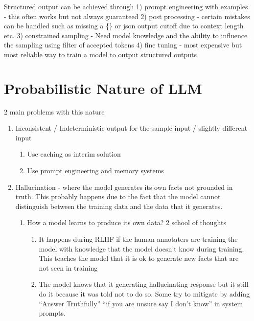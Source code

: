 \documentclass[
  letterpaper,
  DIV=11,
  numbers=noendperiod]{scrreprt}
\providecommand{\tightlist}{%
  \setlength{\itemsep}{0pt}\setlength{\parskip}{0pt}}\usepackage{longtable,booktabs,array}
\begin{document}
Structured output can be achieved through 1) prompt engineering with
examples - this often works but not always guaranteed 2) post processing
- certain mistakes can be handled such as missing a \{\} or json output
cutoff due to context length etc. 3) constrained sampling - Need model
knowledge and the ability to influence the sampling using filter of
accepted tokens 4) fine tuning - most expensive but most reliable way to
train a model to output structured outputs

\section*{Probabilistic Nature of
LLM}\label{probabilistic-nature-of-llm}


2 main problems with this nature

\begin{enumerate}
\def\labelenumi{\arabic{enumi})}
\tightlist
\item
  Inconsistent / Indeterministic output for the sample input / slightly
  different input

  \begin{enumerate}
  \def\labelenumii{\arabic{enumii})}
  \tightlist
  \item
    Use caching as interim solution
  \item
    Use prompt engineering and memory systems
  \end{enumerate}
\item
  Hallucination - where the model generates its own facts not grounded
  in truth. This probably happens due to the fact that the model cannot
  distinguish between the training data and the data that it generates.

  \begin{enumerate}
  \def\labelenumii{\arabic{enumii})}
  \tightlist
  \item
    How a model learns to produce its own data? 2 school of thoughts

    \begin{enumerate}
    \def\labelenumiii{\arabic{enumiii})}
    \tightlist
    \item
      It happens during RLHF if the human annotaters are training the
      model with knowledge that the model doesn't know during training.
      This teaches the model that it is ok to generate new facts that
      are not seen in training
    \item
      The model knows that it generating hallucinating response but it
      still do it because it was told not to do so. Some try to mitigate
      by adding ``Answer Truthfully'' ``if you are unsure say I don't
      know'' in system prompts.
    \end{enumerate}
  \end{enumerate}
\end{enumerate}
\end{document}
